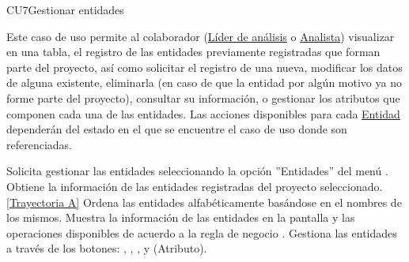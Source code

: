 	\begin{UseCase}{CU7}{Gestionar entidades}{
			
		Este caso de uso permite al colaborador (\hyperlink{jefe}{Líder de análisis} o \hyperlink{analista}{Analista}) visualizar en una tabla, el registro de las entidades previamente registradas que forman parte del proyecto, así como solicitar el registro de una nueva, modificar los datos de alguna existente, eliminarla (en caso de que la entidad por algún motivo ya no forme parte del proyecto), consultar su información, o gestionar los atributos que componen cada una de las entidades.
     	Las acciones disponibles para cada \hyperlink{entidadEntidad}{Entidad} dependerán del estado en el que se encuentre el caso de uso donde son referenciadas.  
	}
	
\end{UseCase}
\begin{UCtrayectoria}
	\UCpaso[\UCactor] Solicita gestionar las entidades seleccionando la opción ''Entidades'' del menú .
	\UCpaso[\UCsist] Obtiene la información de las entidades registradas del proyecto seleccionado. \hyperlink{CU7:TAA}{[Trayectoria A]}
	\UCpaso[\UCsist] Ordena las entidades alfabéticamente basándose en el nombres de los mismos.
	\UCpaso[\UCsist] Muestra la información de las entidades en la pantalla  y las operaciones disponibles de acuerdo a la regla de negocio . \label{CU7-P4}
	\UCpaso[\UCactor] Gestiona las entidades a través de los botones: , \editar , \eliminar,  y (Atributo). 
\end{UCtrayectoria}		
